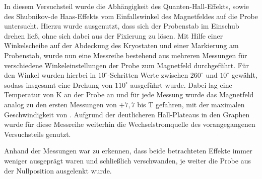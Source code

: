 
In diesem Versuchsteil wurde die Abhängigkeit des Quanten-Hall-Effekts, sowie des Shubnikov-de Haas-Effekts vom Einfallswinkel des Magnetfeldes auf die Probe untersucht. Hierzu wurde ausgenutzt, dass sich der Probenstab im Einschub drehen ließ, ohne sich dabei aus der Fixierung zu lösen. 
Mit Hilfe einer Winkelscheibe auf der Abdeckung des Kryostaten und einer Markierung am Probenstab, wurde nun eine Messreihe bestehend aus mehreren Messungen für verschiedene Winkeleinstellungen der Probe zum Magnetfeld durchgeführt. Für den Winkel wurden hierbei in $10^\circ$-Schritten Werte zwischen $260^\circ$ und $10^\circ$  gewählt, sodass insgesamt eine Drehung von $110^\circ$ ausgeführt wurde. Dabei lag eine Temperatur von \unit[2]{K} an der Probe an und für jede Messung wurde das Magnetfeld analog zu den ersten Messungen von $+7,7$ bis \unit[-7,7]{T} gefahren, mit der maximalen Geschwindigkeit von . Aufgrund der deutlicheren Hall-Plateaus in den Graphen wurde für diese Messreihe weiterhin die Wechselstromquelle des vorangegangenen Versuchsteils genutzt. 

Anhand der Messungen war zu erkennen, dass beide betrachteten Effekte immer weniger ausgeprägt waren und schließlich verschwanden, je weiter die Probe aus der Nullposition ausgelenkt wurde. 
